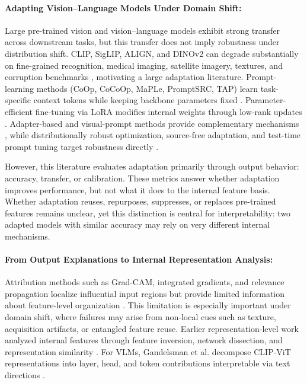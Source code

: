 \paragraph{Adapting Vision--Language Models Under Domain Shift:}
Large pre-trained vision and vision--language models exhibit strong transfer across downstream tasks, but this transfer does not imply robustness under distribution shift. CLIP, SigLIP, ALIGN, and DINOv2 can degrade substantially on fine-grained recognition, medical imaging, satellite imagery, textures, and corruption benchmarks \citep{radford2021learning, zhai2023sigmoid, jia2021scaling, oquab2024dinov2, hendrycks2019benchmarking}, motivating a large adaptation literature. Prompt-learning methods (CoOp, CoCoOp, MaPLe, PromptSRC, TAP) learn task-specific context tokens while keeping backbone parameters fixed \citep{zhou2022learning, zhou2022conditional, khattak2023maple, khattak2023promptsrc, ding2025tap}. Parameter-efficient fine-tuning via LoRA modifies internal weights through low-rank updates \citep{hu2022lora}. Adapter-based and visual-prompt methods provide complementary mechanisms \citep{gao2024clipadapter, jia2022visual}, while distributionally robust optimization, source-free adaptation, and test-time prompt tuning target robustness directly \citep{sagawa2020distributionally, singha2023ad, shu2022tpt}.

However, this literature evaluates adaptation primarily through output behavior: accuracy, transfer, or calibration. These metrics answer whether adaptation improves performance, but not what it does to the internal feature basis. Whether adaptation reuses, repurposes, suppresses, or replaces pre-trained features remains unclear, yet this distinction is central for interpretability: two adapted models with similar accuracy may rely on very different internal mechanisms.

\vspace{-5pt}
\paragraph{From Output Explanations to Internal Representation Analysis:}
Attribution methods such as Grad-CAM, integrated gradients, and relevance propagation localize influential input regions but provide limited information about feature-level organization \citep{gradcam, IG, LRP}. This limitation is especially important under domain shift, where failures may arise from non-local cues such as texture, acquisition artifacts, or entangled feature reuse. Earlier representation-level work analyzed internal features through feature inversion, network dissection, and representation similarity \citep{mahendran2015understanding, bau2017networkdissection, durrani2020analyzing, csiszarik2021similarity}. For VLMs, Gandelsman et al. decompose CLIP-ViT representations into layer, head, and token contributions interpretable via text directions \citep{gandelsman2024interpreting}.

